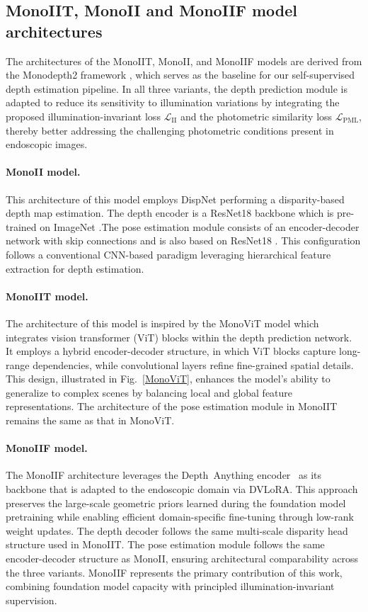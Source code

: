 \documentclass[a4paper,fleqn]{cas-dc}
\begin{document}
\subsection{MonoIIT, MonoII and MonoIIF model architectures\label{sec:model_architectures}}  
%
The architectures of the MonoIIT, MonoII, and MonoIIF models are derived from the Monodepth2 framework \citep{Godard_ICCV_2019}, which serves as the baseline for our self-supervised depth estimation pipeline. In all three variants, the depth prediction module is adapted to reduce its sensitivity to illumination variations by integrating the proposed illumination-invariant loss $\mathcal{L}_\textrm{II}$ and the photometric similarity loss $\mathcal{L}_\textrm{PML}$, thereby better addressing the challenging photometric conditions present in endoscopic images.

%
\paragraph{\bf MonoII model.}  
This architecture of this model employs DispNet performing a disparity-based depth map estimation. The depth encoder is a ResNet18 backbone which is pre-trained on ImageNet \citep{Deng_CVPR_2009}.The pose estimation module consists of an encoder-decoder network with skip connections and is also based on ResNet18 \citep{He_CVPR_2016}. This configuration follows a conventional CNN-based paradigm leveraging hierarchical feature extraction for depth estimation.  
%
\paragraph{\bf MonoIIT model.}  
The architecture of this model is inspired by the MonoViT model \citep{Zhao_3DV_2022} which integrates vision transformer (ViT) blocks within the depth prediction network. It employs a hybrid encoder-decoder structure, in which ViT blocks capture long-range dependencies, while convolutional layers refine fine-grained spatial details. This design, illustrated in Fig.~\ref{MonoViT}, enhances the model’s ability to generalize to complex scenes by balancing local and global feature representations. The architecture of the pose estimation module in MonoIIT remains the same as that in MonoViT.
%

\paragraph{MonoIIF model.}
The MonoIIF architecture leverages the Depth~Anything encoder~\citep{yang2024depth} as its backbone that is
adapted to the endoscopic domain via DVLoRA. This approach preserves the large-scale geometric priors 
learned during the foundation model pretraining while enabling efficient domain-specific fine-tuning through 
low-rank weight updates. The depth decoder follows the same multi-scale disparity head structure used 
in MonoIIT. The pose estimation module follows the same encoder-decoder structure as MonoII, ensuring 
architectural comparability across the three variants. MonoIIF represents the primary contribution of this 
work, combining foundation model capacity with principled illumination-invariant supervision.
\end{document}
